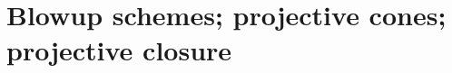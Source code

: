 \section{Blowup schemes; projective cones; projective closure}
\label{section:blowup-schemes-projective-cones-closure}

